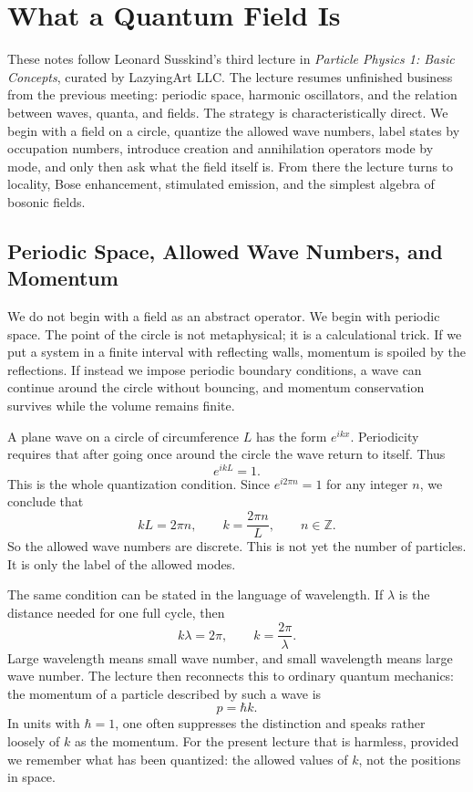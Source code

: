 \chapter{What a Quantum Field Is}

These notes follow Leonard Susskind's third lecture in \emph{Particle Physics 1: Basic Concepts}, curated by LazyingArt LLC. The lecture resumes unfinished business from the previous meeting: periodic space, harmonic oscillators, and the relation between waves, quanta, and fields. The strategy is characteristically direct. We begin with a field on a circle, quantize the allowed wave numbers, label states by occupation numbers, introduce creation and annihilation operators mode by mode, and only then ask what the field itself is. From there the lecture turns to locality, Bose enhancement, stimulated emission, and the simplest algebra of bosonic fields.

\section{Periodic Space, Allowed Wave Numbers, and Momentum}

We do not begin with a field as an abstract operator. We begin with periodic space. The point of the circle is not metaphysical; it is a calculational trick. If we put a system in a finite interval with reflecting walls, momentum is spoiled by the reflections. If instead we impose periodic boundary conditions, a wave can continue around the circle without bouncing, and momentum conservation survives while the volume remains finite.

A plane wave on a circle of circumference \(L\) has the form \(e^{ikx}\). Periodicity requires that after going once around the circle the wave return to itself. Thus
\begin{equation}
e^{ikL}=1.
\end{equation}
This is the whole quantization condition. Since \(e^{i2\pi n}=1\) for any integer \(n\), we conclude that
\begin{equation}
kL=2\pi n,
\qquad
k=\frac{2\pi n}{L},
\qquad
n\in\mathbb{Z}.
\end{equation}
So the allowed wave numbers are discrete. This is not yet the number of particles. It is only the label of the allowed modes.

The same condition can be stated in the language of wavelength. If \(\lambda\) is the distance needed for one full cycle, then
\begin{equation}
k\lambda=2\pi,
\qquad
k=\frac{2\pi}{\lambda}.
\end{equation}
Large wavelength means small wave number, and small wavelength means large wave number. The lecture then reconnects this to ordinary quantum mechanics: the momentum of a particle described by such a wave is
\begin{equation}
p=\hbar k.
\end{equation}
In units with \(\hbar=1\), one often suppresses the distinction and speaks rather loosely of \(k\) as the momentum. For the present lecture that is harmless, provided we remember what has been quantized: the allowed values of \(k\), not the positions in space.

